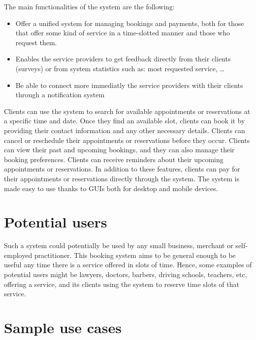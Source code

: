 \documentclass{article}
\begin{document}
The main functionalities of the system are the following: 
\begin{itemize}
	\item Offer a unified system for managing bookings and payments,
		both for those that offer some kind of service in a time-slotted
		manner and those who request them.
	\item Enables the service providers to get feedback directly from their
		clients (surveys) or from system statistics such as: most requested service, \ldots
	\item Be able to connect more immediatly the service providers with their
		clients through a notification system
\end{itemize}
Clients can use the system to search for available appointments or reservations at a specific time and date. Once they find an available slot, clients can book it by providing their contact information and any other necessary details. Clients can cancel or reschedule their appointments or reservations before they occur. Clients can view their past and upcoming bookings, and they can also manage their booking preferences. Clients can receive reminders about their upcoming appointments or reservations. In addition to these features, clients can pay for their appointments or reservations directly through the system. The system is made easy to use thanks to GUIs both for desktop and mobile devices.

\section{Potential users}
Such a system could potentially be used by any small business, merchant or
self-employed practitioner. This booking system aims to be general enough to be
useful any time there is a service offered in slots of time. Hence, some 
examples of potential users might be lawyers, doctors, barbers, driving schools, teachers, etc, offering a service, and its clients using the system to reserve time slots of
that service.

\section{Sample use cases}
\end{document}
